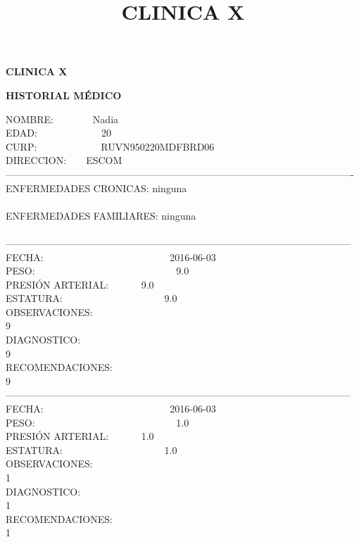 \documentclass[10pt,a4paper]{letter}
\title{\bf CLINICA X}
\begin{document}
\begin{center}
{\scshape\LARGE \bf CLINICA X\par}
{\bf HISTORIAL MÉDICO\\}
\end{center}
NOMBRE:\ \ \ \ \ \ \ \ Nadia\\
EDAD:\ \ \ \ \ \ \ \ \ \ \ \ \ 20\\
CURP:\ \ \ \ \ \ \ \ \ \ \ \ \ RUVN950220MDFBRD06 \\
DIRECCION:\ \ \ \ ESCOM\\
----------------------------------------------------------------------------------------------------------\\
ENFERMEDADES CRONICAS: ninguna\\ \\
ENFERMEDADES FAMILIARES: ninguna \\ \\
---------------------------------------------------------------------------------------------------------\\
FECHA: \ \ \ \ \ \ \ \ \ \ \ \ \ \ \ \ \ \ \ \ \ \ \ \ \ 2016-06-03 \\
PESO: \ \ \ \ \ \ \ \ \ \ \ \ \ \ \ \ \ \ \ \ \ \ \ \ \ \ \ \ 9.0 \\
PRESIÓN ARTERIAL: \ \ \ \ \ \ 9.0 \\
ESTATURA: \ \ \ \ \ \ \ \ \ \ \ \ \ \ \ \ \ \ \ \ 9.0\\
OBSERVACIONES:\\
9\\
DIAGNOSTICO:\\
9\\
RECOMENDACIONES:\\
9\\
--------------------------------------------------------------------------------------------------------- \\
FECHA: \ \ \ \ \ \ \ \ \ \ \ \ \ \ \ \ \ \ \ \ \ \ \ \ \ 2016-06-03 \\
PESO: \ \ \ \ \ \ \ \ \ \ \ \ \ \ \ \ \ \ \ \ \ \ \ \ \ \ \ \ 1.0 \\
PRESIÓN ARTERIAL: \ \ \ \ \ \ 1.0 \\
ESTATURA: \ \ \ \ \ \ \ \ \ \ \ \ \ \ \ \ \ \ \ \ 1.0\\
OBSERVACIONES:\\
1\\
DIAGNOSTICO:\\
1\\
RECOMENDACIONES:\\
1\\
\end{document}
